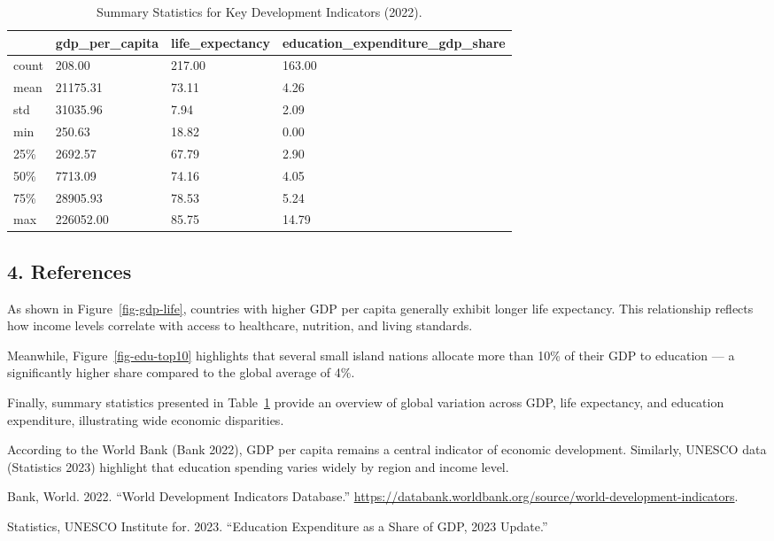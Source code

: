\documentclass[
  letterpaper,
  DIV=11,
  numbers=noendperiod]{scrartcl}
\newlength{\cslhangindent}
\newenvironment{CSLReferences}[2] %
 {\begin{list}{}{%
  \setlength{\itemindent}{0pt}
  \setlength{\leftmargin}{0pt}
  \setlength{\parsep}{0pt}
  \ifodd #1
   \setlength{\leftmargin}{\cslhangindent}
   \setlength{\itemindent}{-1\cslhangindent}
  \fi
  \setlength{\itemsep}{#2\baselineskip}}}
 {\end{list}}
\begin{document}
\begin{longtable}[]{@{}llll@{}}

\caption{\label{tbl-summary-stats}Summary Statistics for Key Development
Indicators (2022).}

\tabularnewline

\toprule\noalign{}
& gdp\_per\_capita & life\_expectancy &
education\_expenditure\_gdp\_share \\
\midrule\noalign{}
\endhead
\bottomrule\noalign{}
\endlastfoot
count & 208.00 & 217.00 & 163.00 \\
mean & 21175.31 & 73.11 & 4.26 \\
std & 31035.96 & 7.94 & 2.09 \\
min & 250.63 & 18.82 & 0.00 \\
25\% & 2692.57 & 67.79 & 2.90 \\
50\% & 7713.09 & 74.16 & 4.05 \\
75\% & 28905.93 & 78.53 & 5.24 \\
max & 226052.00 & 85.75 & 14.79 \\

\end{longtable}

\subsection{4. References}\label{references}

As shown in Figure~\ref{fig-gdp-life}, countries with higher GDP per
capita generally exhibit longer life expectancy. This relationship
reflects how income levels correlate with access to healthcare,
nutrition, and living standards.

Meanwhile, Figure~\ref{fig-edu-top10} highlights that several small
island nations allocate more than 10\% of their GDP to education --- a
significantly higher share compared to the global average of 4\%.

Finally, summary statistics presented in Table~\ref{tbl-summary-stats}
provide an overview of global variation across GDP, life expectancy, and
education expenditure, illustrating wide economic disparities.

According to the World Bank (Bank 2022), GDP per capita remains a
central indicator of economic development. Similarly, UNESCO data
(Statistics 2023) highlight that education spending varies widely by
region and income level.

\label{refs}
\begin{CSLReferences}{1}{0}
Bank, World. 2022. {``World Development Indicators Database.''}
\url{https://databank.worldbank.org/source/world-development-indicators}.

Statistics, UNESCO Institute for. 2023. {``Education Expenditure as a
Share of GDP, 2023 Update.''}

\end{CSLReferences}
\end{document}
